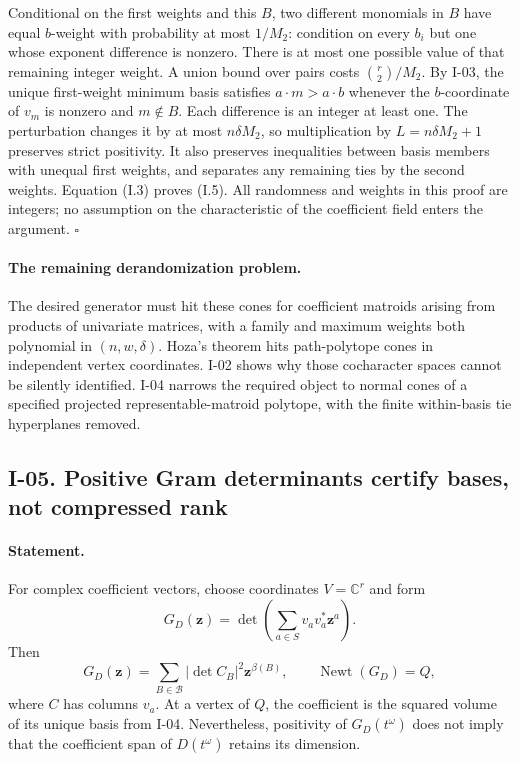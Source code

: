 \documentclass[11pt,a4paper]{article}
\theoremstyle{definition}\newtheorem{definition}{Definition}
\begin{document}
Conditional on the first weights and this $B$, two different
monomials in $B$ have equal $b$-weight with probability at most
$1/M_2$: condition on every $b_i$ but one whose exponent difference
is nonzero.  There is at most one possible value of that remaining
integer weight.  A union bound over pairs costs
$\binom r2/M_2$.  By I-03, the unique first-weight minimum basis
satisfies $a\cdot m>a\cdot b$ whenever the $b$-coordinate of
$v_m$ is nonzero and $m\notin B$.  Each difference is an integer
at least one.  The perturbation changes it by at most
$n\delta M_2$, so multiplication by $L=n\delta M_2+1$ preserves
strict positivity.  It also preserves inequalities between basis
members with unequal first weights, and separates any remaining
ties by the second weights.  Equation (I.3) proves (I.5).
All randomness and weights in this proof are integers; no assumption
on the characteristic of the coefficient field enters the argument.
\hfill$\square$

\paragraph{The remaining derandomization problem.}
The desired generator must hit these cones for coefficient matroids
arising from products of univariate matrices, with a family and
maximum weights both polynomial in $(n,w,\delta)$.  Hoza's theorem
hits path-polytope cones in independent vertex coordinates.  I-02
shows why those cocharacter spaces cannot be silently identified.
I-04 narrows the required object to normal cones of a specified
projected representable-matroid polytope, with the finite
within-basis tie hyperplanes removed.

\subsection{I-05. Positive Gram determinants certify bases, not compressed rank}
\label{I-05}

\paragraph{Statement.}
For complex coefficient vectors, choose coordinates $V=\mathbb C^r$
and form
\[
 G_D(\mathbf z)=\det\left(\sum_{a\in S}v_av_a^*\mathbf z^a\right).
\]
Then
\[
 G_D(\mathbf z)=\sum_{B\in\mathcal B}
                  |\det C_B|^2\mathbf z^{\beta(B)},
\qquad \operatorname{Newt}(G_D)=Q,
\tag{I.6}
\]
where $C$ has columns $v_a$.  At a vertex of $Q$, the coefficient
is the squared volume of its unique basis from I-04.  Nevertheless,
positivity of $G_D(t^\omega)$ does not imply that the coefficient
span of $D(t^\omega)$ retains its dimension.
\end{document}
